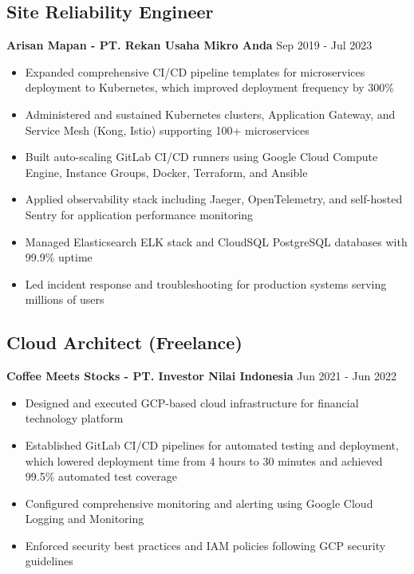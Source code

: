 \documentclass[11pt,a4paper]{article}
\newcommand{\company}[1]{\textbf{\color{primary}#1}}
\newcommand{\daterange}[1]{\color{secondary}#1}  %
\begin{document}
\subsection{Site Reliability Engineer}
\company{Arisan Mapan - PT. Rekan Usaha Mikro Anda} \hfill \daterange{Sep 2019 - Jul 2023}
\begin{itemize}[leftmargin=*, itemsep=2pt]
        \item Expanded comprehensive CI/CD pipeline templates for microservices deployment to Kubernetes, which improved deployment frequency by 300\%
        \item Administered and sustained Kubernetes clusters, Application Gateway, and Service Mesh (Kong, Istio) supporting 100+ microservices
    \item Built auto-scaling GitLab CI/CD runners using Google Cloud Compute Engine, Instance Groups, Docker, Terraform, and Ansible
        \item Applied observability stack including Jaeger, OpenTelemetry, and self-hosted Sentry for application performance monitoring
    \item Managed Elasticsearch ELK stack and CloudSQL PostgreSQL databases with 99.9\% uptime
    \item Led incident response and troubleshooting for production systems serving millions of users
\end{itemize}

\subsection{Cloud Architect (Freelance)}
\company{Coffee Meets Stocks - PT. Investor Nilai Indonesia} \hfill \daterange{Jun 2021 - Jun 2022}
\begin{itemize}[leftmargin=*, itemsep=2pt]
        \item Designed and executed GCP-based cloud infrastructure for financial technology platform
        \item Established GitLab CI/CD pipelines for automated testing and deployment, which lowered deployment time from 4 hours to 30 minutes and achieved 99.5\% automated test coverage
    \item Configured comprehensive monitoring and alerting using Google Cloud Logging and Monitoring
        \item Enforced security best practices and IAM policies following GCP security guidelines
\end{itemize}
\end{document}
